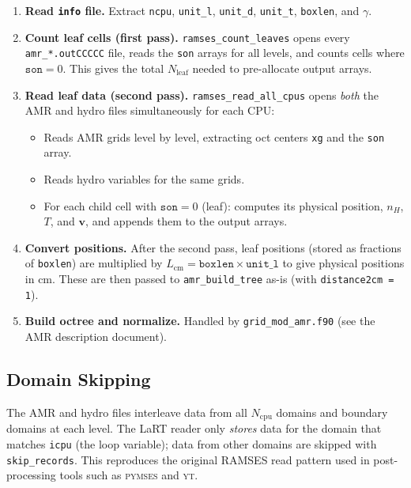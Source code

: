 \documentclass[english,a4paper]{my_memo}
\begin{document}
\begin{enumerate}
  \item \textbf{Read \texttt{info} file.}  Extract \texttt{ncpu},
        \texttt{unit\_l}, \texttt{unit\_d}, \texttt{unit\_t},
        \texttt{boxlen}, and $\gamma$.

  \item \textbf{Count leaf cells (first pass).}
        \texttt{ramses\_count\_leaves} opens every
        \texttt{amr\_*.outCCCCC} file, reads the \texttt{son} arrays for
        all levels, and counts cells where $\texttt{son} = 0$.  This gives
        the total $N_\mathrm{leaf}$ needed to pre-allocate output arrays.

  \item \textbf{Read leaf data (second pass).}
        \texttt{ramses\_read\_all\_cpus} opens \emph{both} the AMR and
        hydro files simultaneously for each CPU:
        \begin{itemize}
          \item Reads AMR grids level by level, extracting oct centers
                \texttt{xg} and the \texttt{son} array.
          \item Reads hydro variables for the same grids.
          \item For each child cell with $\texttt{son} = 0$ (leaf): computes
                its physical position, $n_H$, $T$, and $\boldsymbol{v}$, and
                appends them to the output arrays.
        \end{itemize}

  \item \textbf{Convert positions.}  After the second pass, leaf positions
        (stored as fractions of \texttt{boxlen}) are multiplied by
        $L_\mathrm{cm} = \texttt{boxlen} \times \texttt{unit\_l}$ to give
        physical positions in cm.  These are then passed to
        \texttt{amr\_build\_tree} as-is (with \texttt{distance2cm = 1}).

  \item \textbf{Build octree and normalize.}  Handled by
        \texttt{grid\_mod\_amr.f90} (see the AMR description document).
\end{enumerate}

\subsection{Domain Skipping}

The AMR and hydro files interleave data from all $N_\mathrm{cpu}$ domains
and boundary domains at each level.  The LaRT reader only \emph{stores} data
for the domain that matches \texttt{icpu} (the loop variable); data from
other domains are skipped with \texttt{skip\_records}.  This reproduces the
original RAMSES read pattern used in post-processing tools such as
\textsc{pymses} and \textsc{yt}.
\end{document}
